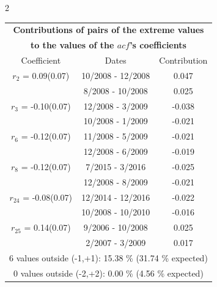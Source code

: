 
\thispagestyle{empty}
\begin{multicols}{2}{ 
\begin{tabular}{ccc}
\multicolumn{3}{c}{\textbf{Contributions of pairs of the extreme values} }  \vspace{-.10in}  \\ 
\multicolumn{3}{c}{ \textbf{to the values of the $acf$'s coefficients}} \\ 
\hline 
\hline                  Coefficient  &  Dates &  Contribution \\ 
\hline 
  $r_{ 2}$ = 0.09(0.07) &      10/2008 - 12/2008 &        0.047   \vspace{-.10in} \\  
&        8/2008 - 10/2008 &        0.025  \vspace{-.02in} \\ \hline 
  $r_{ 3}$ = -0.10(0.07) &      12/2008 -  3/2009 &       -0.038    \vspace{-.10in} \\ 
  &       10/2008 -  1/2009 &       -0.021  \vspace{-.02in}   \\ \hline 
    $r_{ 6}$ = -0.12(0.07) &      11/2008 -  5/2009 &       -0.021    \vspace{-.10in} \\ 
  &       12/2008 -  6/2009 &       -0.019  \vspace{-.02in}   \\ \hline 
    $r_{ 8}$ = -0.12(0.07) &       7/2015 -  3/2016 &       -0.025    \vspace{-.10in} \\ 
  &       12/2008 -  8/2009 &       -0.021  \vspace{-.02in}   \\ \hline 
    $r_{24}$ = -0.08(0.07) &      12/2014 - 12/2016 &       -0.022    \vspace{-.10in} \\ 
  &       10/2008 - 10/2010 &       -0.016  \vspace{-.02in}   \\ \hline 
    $r_{25}$ = 0.14(0.07) &       9/2006 - 10/2008 &        0.025   \vspace{-.10in} \\  
&        2/2007 -  3/2009 &        0.017  \vspace{-.02in} \\ \hline 
\multicolumn{3}{c}{               6 values outside (-1,+1): 15.38  \% (31.74  \% expected)}\vspace{-.10in} \\ 
\multicolumn{3}{c}{               0 values outside (-2,+2):  0.00 \%  (4.56 \% expected) } \\
 \end{tabular} \\ 
 } 
\end{multicols} 
